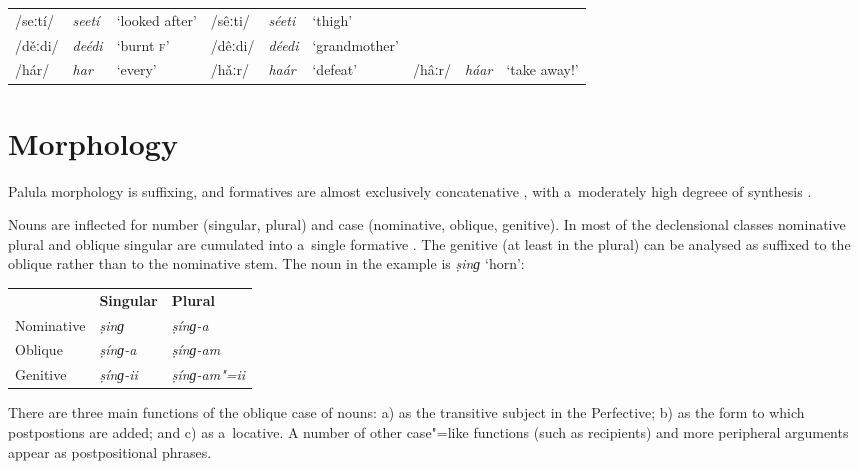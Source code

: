 \begin{table}[H]
\begin{tabularx}{\textwidth}{ l l Q l l Q l l Q }
/seːtí/ &
\textit{seetí} &
`looked after' &
/sêːti/ &
\textit{séeti} &
`thigh' &
&
&
\\
/děːdi/ &
\textit{deédi} &
`burnt \textsc{f}' &
/dêːdi/ &
\textit{déedi} &
`grand\-mother' & & &
\\
/hár/ &
\textit{har} &
`every' &
/hǎːr/ &
\textit{haár} &
`defeat' &
/hâːr/ &
\textit{háar} &
`take away!' \\
\end{tabularx}
\end{table}


\section{Morphology}
\label{sec:2-2}

Palula morphology is suffixing, and formatives are almost exclusively concatenative \citep{bickel_fusion_2013}, with a~moderately high degreee of synthesis \citep{bickel_inflectional_2013}. 


Nouns are inflected for number (singular, plural) and case (nominative, oblique, genitive). In most of the declensional classes nominative plural and oblique singular are cumulated into a~single formative \citep{bickel_exponence_2013}. The genitive (at least in the plural) can be analysed as suffixed to the oblique rather than to the nominative stem. The noun in the example is \textit{ṣinɡ} `horn':


\begin{table}[H]
\begin{tabular}{ l l l }
&
\textbf{Singular} &
\textbf{Plural} \\
Nominative &
\textit{ṣinɡ} &
\textit{ṣínɡ-a} \\
Oblique &
\textit{ṣínɡ-a} &
\textit{ṣínɡ-am} \\
Genitive &
\textit{ṣínɡ-ii} &
\textit{ṣínɡ-am"=ii} \\
\end{tabular}
\end{table}



There are three main functions of the oblique case of nouns: a) as the transitive subject in the Perfective; b) as the form to which postpostions are added; and c) as a~locative. A number of other case"=like functions (such as recipients) and more peripheral arguments appear as postpositional phrases.


